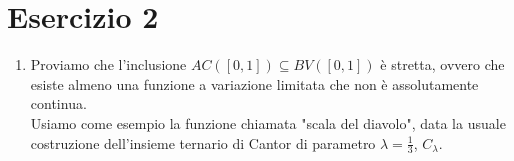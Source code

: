\section{Esercizio 2}
\begin{enumerate}
    \item Proviamo che l'inclusione $AC([0,1])\subseteq BV([0,1])$ è stretta, ovvero che esiste almeno una funzione a variazione limitata che non è assolutamente continua.\\
    Usiamo come esempio la funzione chiamata "scala del diavolo", data la usuale costruzione dell'insieme ternario di Cantor di parametro $\lambda=\frac{1}{3}$, $C_\lambda$.\begin{center}
\end{center}
\end{enumerate}
